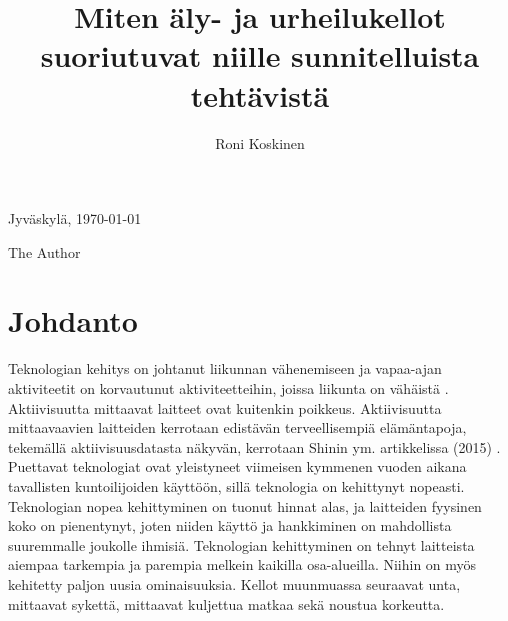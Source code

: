 \documentclass[utf8,bachelor,finnish]{bachelor}
\begin{document}
\title{Miten äly- ja urheilukellot suoriutuvat niille sunnitelluista tehtävistä}

\author{Roni Koskinen}


\maketitle


Jyväskylä, \today

\bigskip

The Author


\mainmatter


\chapter{Johdanto}
  Teknologian kehitys on johtanut liikunnan vähenemiseen ja vapaa-ajan aktiviteetit on korvautunut aktiviteetteihin, joissa liikunta on vähäistä \parencite{petrusevski_interventions_2021}.
   Aktiivisuutta mittaavat laitteet ovat kuitenkin poikkeus. Aktiivisuutta mittaavaavien laitteiden kerrotaan edistävän terveellisempiä elämäntapoja, tekemällä aktiivisuusdatasta näkyvän, kerrotaan Shinin ym. artikkelissa (2015) \parencite{shin2015understanding}.
  Puettavat teknologiat ovat yleistyneet viimeisen kymmenen vuoden aikana tavallisten kuntoilijoiden käyttöön, sillä teknologia on kehittynyt nopeasti.
    Teknologian nopea kehittyminen on tuonut hinnat alas, ja laitteiden fyysinen koko on pienentynyt, joten niiden käyttö ja hankkiminen on mahdollista suuremmalle joukolle ihmisiä.
     Teknologian kehittyminen on tehnyt laitteista aiempaa tarkempia ja parempia melkein kaikilla osa-alueilla. Niihin on myös kehitetty paljon uusia ominaisuuksia.
      Kellot muunmuassa seuraavat unta, mittaavat sykettä, mittaavat kuljettua matkaa sekä noustua korkeutta.\\
\end{document}
